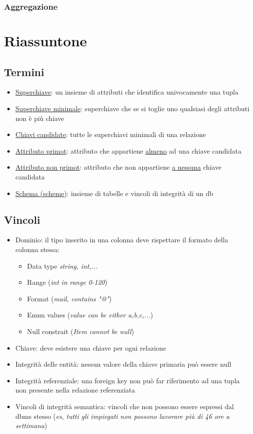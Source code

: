 \subsubsection*{Aggregazione}

\newpage
\section{Riassuntone}
\subsection{Termini}
\begin{itemize}
  \item \underline{Superchiave}: un insieme di attributi che identifica univocamente una tupla
  \item \underline{Superchiave minimale}: superchiave che se si toglie uno qualsiasi degli attributi non è più chiave
  \item \underline{Chiavi candidate}: tutte le superchiavi minimali di una relazione
  \item \underline{Attributo primot}: attributo che appartiene \underline{almeno} ad una chiave candidata
  \item \underline{Attributo non primot}: attributo che non appartiene \underline{a nessuna} chiave candidata
  \item \underline{Schema (scheme)}: insieme di tabelle e vincoli di integrità di un db
\end{itemize}
\subsection{Vincoli}
\begin{itemize}
  \item Dominio: il tipo inserito in una colonna deve rispettare il formato della colonna stessa: 
    \begin{itemize}
      \item Data type \textit{\textit{string, int,...}}
      \item Range (\textit{int in range 0-120})
      \item Format (\textit{mail, contains "@"})
      \item Enum values (\textit{value can be either a,b,c,...})
      \item Null constrait (\textit{Item cannot be null})
    \end{itemize}
  \item Chiave: deve esistere una chiave per ogni relazione
  \item Integrità delle entità: nessun valore della chiave primaria può essere null
  \item Integrità referenziale: una foreign key non può far riferimento ad una tupla non presente nella relazione referenziata
  \item Vincoli di integrità semantica: vincoli che non possono essere espressi dal dbms stesso (\textit{es, tutti gli impiegati non possono lavorare più di 46 ore a settimana})
\end{itemize}
